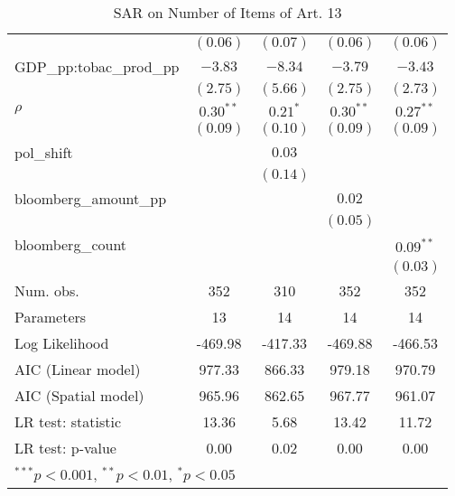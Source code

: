 \begin{table}[!h]
\begin{center}
\begin{tabular}{l c c c c }
                         & $(0.06)$    & $(0.07)$    & $(0.06)$    & $(0.06)$    \\
GDP\_pp:tobac\_prod\_pp  & $-3.83$     & $-8.34$     & $-3.79$     & $-3.43$     \\
                         & $(2.75)$    & $(5.66)$    & $(2.75)$    & $(2.73)$    \\
$\rho$                   & $0.30^{**}$ & $0.21^{*}$  & $0.30^{**}$ & $0.27^{**}$ \\
                         & $(0.09)$    & $(0.10)$    & $(0.09)$    & $(0.09)$    \\
pol\_shift               &             & $0.03$      &             &             \\
                         &             & $(0.14)$    &             &             \\
bloomberg\_amount\_pp    &             &             & $0.02$      &             \\
                         &             &             & $(0.05)$    &             \\
bloomberg\_count         &             &             &             & $0.09^{**}$ \\
                         &             &             &             & $(0.03)$    \\
\midrule
Num. obs.                & 352         & 310         & 352         & 352         \\
Parameters               & 13          & 14          & 14          & 14          \\
Log Likelihood           & -469.98     & -417.33     & -469.88     & -466.53     \\
AIC (Linear model)       & 977.33      & 866.33      & 979.18      & 970.79      \\
AIC (Spatial model)      & 965.96      & 862.65      & 967.77      & 961.07      \\
LR test: statistic       & 13.36       & 5.68        & 13.42       & 11.72       \\
LR test: p-value         & 0.00        & 0.02        & 0.00        & 0.00        \\
\bottomrule
\multicolumn{5}{l}{\scriptsize{$^{***}p<0.001$, $^{**}p<0.01$, $^*p<0.05$}}
\end{tabular}
\caption{SAR on Number of Items of Art. 13}
\label{table:coefficients}
\end{center}
\end{table}
